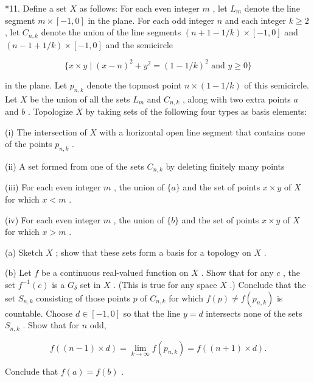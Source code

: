 \documentclass[10pt]{article}
\begin{document}
*11. Define a set \(X\) as follows: For each even integer \(m\) , let \({L}_{m}\) denote the line segment \(m \times  \left\lbrack  {-1,0}\right\rbrack\) in the plane. For each odd integer \(n\) and each integer \(k \geq  2\) , let \({C}_{n,k}\) denote the union of the line segments \(\left( {n + 1 - 1/k}\right)  \times  \left\lbrack  {-1,0}\right\rbrack\) and \(\left( {n - 1 + 1/k}\right)  \times  \left\lbrack  {-1,0}\right\rbrack\) and the semicircle

\[
\{ x \times  y \mid  {\left( x - n\right) }^{2} + {y}^{2} = {\left( 1 - 1/k\right) }^{2}\text{ and }y \geq  0\}
\]

in the plane. Let \({p}_{n,k}\) denote the topmost point \(n \times  \left( {1 - 1/k}\right)\) of this semicircle. Let \(X\) be the union of all the sets \({L}_{m}\) and \({C}_{n,k}\) , along with two extra points \(a\) and \(b\) . Topologize \(X\) by taking sets of the following four types as basis elements:

(i) The intersection of \(X\) with a horizontal open line segment that contains none of the points \({p}_{n,k}\) .

(ii) A set formed from one of the sets \({C}_{n,k}\) by deleting finitely many points

(iii) For each even integer \(m\) , the union of \(\{ a\}\) and the set of points \(x \times  y\) of \(X\) for which \(x < m\) .

(iv) For each even integer \(m\) , the union of \(\{ b\}\) and the set of points \(x \times  y\) of \(X\) for which \(x > m\) .

(a) Sketch \(X\) ; show that these sets form a basis for a topology on \(X\) .

(b) Let \(f\) be a continuous real-valued function on \(X\) . Show that for any \(c\) , the set \({f}^{-1}\left( c\right)\) is a \({G}_{\delta }\) set in \(X\) . (This is true for any space \(X\) .) Conclude that the set \({S}_{n,k}\) consisting of those points \(p\) of \({C}_{n,k}\) for which \(f\left( p\right)  \neq  f\left( {p}_{n,k}\right)\) is countable. Choose \(d \in  \left\lbrack  {-1,0}\right\rbrack\) so that the line \(y = d\) intersects none of the sets \({S}_{n,k}\) . Show that for \(n\) odd,

\[
f\left( {\left( {n - 1}\right)  \times  d}\right)  = \mathop{\lim }\limits_{{k \rightarrow  \infty }}f\left( {p}_{n,k}\right)  = f\left( {\left( {n + 1}\right)  \times  d}\right) .
\]

Conclude that \(f\left( a\right)  = f\left( b\right)\) .
\end{document}

